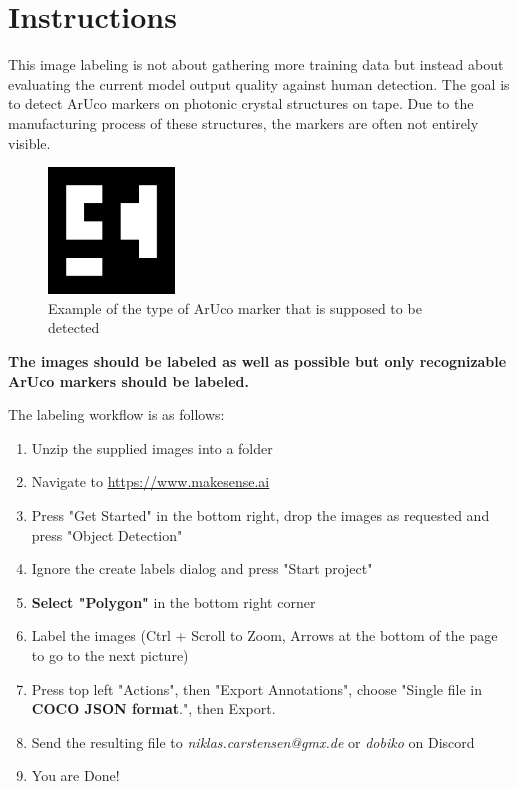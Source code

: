 \documentclass{article}
\begin{document}

    \section*{Instructions}

    This image labeling is not about gathering more training data but instead about evaluating the current model output quality against human detection. The goal is to detect ArUco markers on photonic crystal structures on tape. Due to the manufacturing process of these structures, the markers are often not entirely visible.

    \begin{figure}[h!]
        \begin{center}
          \includegraphics[width=0.3\textwidth]{images/in-img-marker-scaled.png}
        \end{center}
        \caption{Example of the type of ArUco marker that is supposed to be detected}
        \label{fig:marker}
    \end{figure}

    \textbf{The images should be labeled as well as possible but only recognizable ArUco markers should be labeled.}

    The labeling workflow is as follows:
    \begin{enumerate}
        \item Unzip the supplied images into a folder
        \item Navigate to \href{https://www.makesense.ai}{https://www.makesense.ai}
        \item Press "Get Started" in the bottom right, drop the images as requested and press "Object Detection"
        \item Ignore the create labels dialog and press "Start project"
        \item \textbf{Select "Polygon"} in the bottom right corner
        \item Label the images (Ctrl + Scroll to Zoom, Arrows at the bottom of the page to go to the next picture)
        \item Press top left "Actions", then "Export Annotations", choose "Single file in \textbf{COCO JSON format}.", then Export.
        \item Send the resulting file to \textit{niklas.carstensen@gmx.de} or \textit{dobiko} on Discord
        \item You are Done!
    \end{enumerate}
\end{document}
